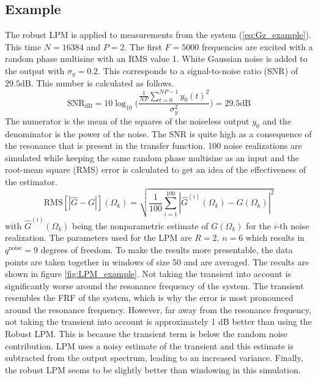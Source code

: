 \newpage
\subsection{Example}
The robust LPM is applied to measurements from the system (\ref{eq:Gz_example}). This time $N = 16384$ and $P=2$. The first $F=5000$ frequencies are excited with a random phase multisine with an RMS value 1. White Gaussian noise is added to the output with $\sigma_y = 0.2$. This corresponds to a signal-to-noise ratio (SNR) of $29.5 \mathrm{dB}$. This number is calculated as follows.
\begin{equation*}
    \mathrm{SNR}_{\mathrm{dB}} = 10 \log_{10} \Big ( \frac{\frac{1}{NP}\sum_{t=0}^{NP-1}y_0(t)^2}{\sigma_y^2} \Big ) = 29.5 \mathrm{dB}
\end{equation*}
The numerator is the mean of the squares of the noiseless output $y_0$ and the denominator is the power of the noise. The SNR is quite high as a consequence of the resonance that is present in the transfer function. 100 noise realizations are simulated while keeping the same random phase multisine as an input and the root-mean square (RMS) error is calculated to get an idea of the effectiveness of the estimator.
\begin{equation*}
    \text{RMS}[|\hat G - G|](\Omega_k) = \sqrt{\frac{1}{100}\sum_{i=1}^{100}|\hat G^{(i)}(\Omega_k)-G(\Omega_k)|^2} 
\end{equation*}
with $\hat G^{(i)}(\Omega_k)$ being the nonparametric estimate of $G(\Omega_k)$ for the $i$-th noise realization. The parameters used for the LPM are $R=2$, $n = 6$ which results in $q^{\text{noise}} = 9$ degrees of freedom. To make the results more presentable, the data points are taken together in windows of size 50 and are averaged. The results are shown in figure \ref{fig:LPM_example}. Not taking the transient into account is significantly worse around the resonance frequency of the system. The transient resembles the FRF of the system, which is why the error is most pronounced around the resonance frequency. However, far away from the resonance frequency, not taking the transient into account is approximately 1 dB better than using the Robust LPM. This is because the transient term is below the random noise contribution. LPM uses a noisy estimate of the transient and this estimate is subtracted from the output spectrum, leading to an increased variance. Finally, the robust LPM seems to be slightly better than windowing in this simulation.



